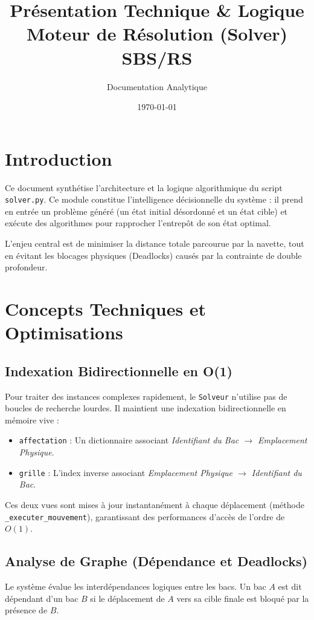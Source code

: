 \documentclass[12pt,a4paper]{article}
\title{\textbf{Présentation Technique \& Logique}\\ Moteur de Résolution (Solver) SBS/RS}
\author{Documentation Analytique}
\date{\today}
\begin{document}
\maketitle
\tableofcontents
\newpage

\section{Introduction}
Ce document synthétise l'architecture et la logique algorithmique du script \texttt{solver.py}. Ce module constitue l'intelligence décisionnelle du système : il prend en entrée un problème généré (un état initial désordonné et un état cible) et exécute des algorithmes pour rapprocher l'entrepôt de son état optimal.

L'enjeu central est de minimiser la distance totale parcourue par la navette, tout en évitant les blocages physiques (Deadlocks) causés par la contrainte de double profondeur.

\section{Concepts Techniques et Optimisations}

\subsection{Indexation Bidirectionnelle en O(1)}
Pour traiter des instances complexes rapidement, le \texttt{Solveur} n'utilise pas de boucles de recherche lourdes. Il maintient une indexation bidirectionnelle en mémoire vive :
\begin{itemize}
    \item \texttt{affectation} : Un dictionnaire associant \textit{Identifiant du Bac $\rightarrow$ Emplacement Physique}.
    \item \texttt{grille} : L'index inverse associant \textit{Emplacement Physique $\rightarrow$ Identifiant du Bac}.
\end{itemize}
Ces deux vues sont mises à jour instantanément à chaque déplacement (méthode \texttt{\_executer\_mouvement}), garantissant des performances d'accès de l'ordre de $O(1)$.

\subsection{Analyse de Graphe (Dépendance et Deadlocks)}
Le système évalue les interdépendances logiques entre les bacs. Un bac $A$ est dit dépendant d'un bac $B$ si le déplacement de $A$ vers sa cible finale est bloqué par la présence de $B$.
\end{document}
